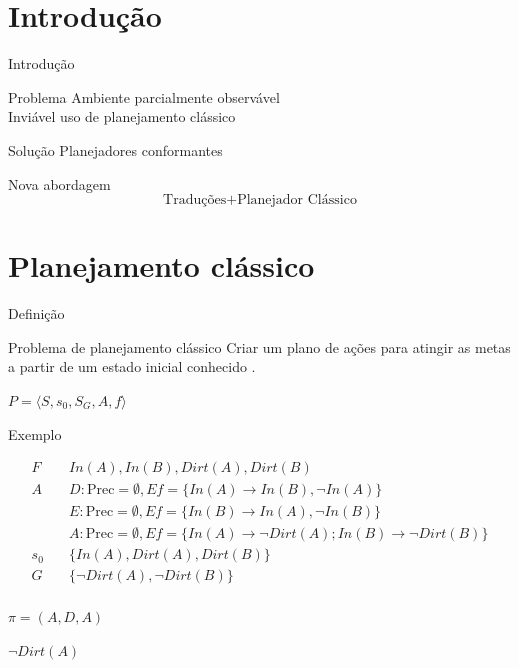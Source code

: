 \begin{frame}
  \titlepage
\end{frame}


\section{Introdução}
\begin{frame}{Introdução}
    
    \begin{block}{Problema}
        Ambiente parcialmente observável\\
        \pause
        Inviável uso de planejamento clássico
    \end{block}
    \pause
    \begin{block}{Solução}
        Planejadores conformantes
    \end{block}
    \pause
    \begin{block}{Nova abordagem}
        \[ \text{Traduções} + \text{Planejador Clássico} \]
    \end{block}

\end{frame}


\section{Planejamento clássico}
\begin{frame}{Definição}
    \begin{block}{Problema de planejamento clássico}
        Criar um plano de ações para atingir as metas a partir de um estado 
inicial conhecido \cite{Ghallab:2004}. \\
        \begin{center}
            $P = \langle S, s_0, S_G, A, f \rangle$
        \end{center}
    \end{block}
    
\end{frame}
\begin{frame}{Exemplo}
    
    \begin{align*}
            F  \quad  & In(A),In(B),Dirt(A),Dirt(B) \\
            A  \quad  & D: \text{Prec} = \emptyset, Ef= \{ In(A) \rightarrow In(B),\lnot In(A) \} \\
                      & E: \text{Prec} = \emptyset, Ef= \{ In(B) \rightarrow In(A),\lnot In(B) \} \\
                      & A: \text{Prec} = \emptyset, Ef= \{ In(A)  \rightarrow \lnot Dirt(A); In(B) \rightarrow \lnot Dirt(B) \} \\
           s_0 \quad  & \{ In(A), Dirt(A), Dirt(B)  \} \\
           G   \quad  & \{ \lnot Dirt(A),\lnot Dirt(B)  \} \\
    \end{align*}
    
    $\pi = (A,D,A)$
    
    $\lnot Dirt(A)$
\end{frame}



